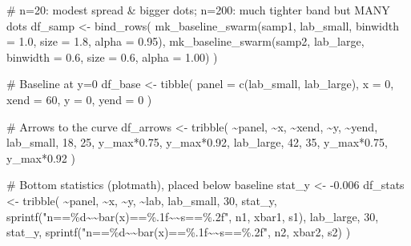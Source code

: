 \documentclass[
  letterpaper,
  DIV=11,
  numbers=noendperiod]{scrreprt}
\newenvironment{Shaded}{\begin{snugshade}}{\end{snugshade}}
\newcommand{\AttributeTok}[1]{\textcolor[rgb]{0.40,0.45,0.13}{#1}}
\newcommand{\CommentTok}[1]{\textcolor[rgb]{0.37,0.37,0.37}{#1}}
\newcommand{\DecValTok}[1]{\textcolor[rgb]{0.68,0.00,0.00}{#1}}
\newcommand{\FloatTok}[1]{\textcolor[rgb]{0.68,0.00,0.00}{#1}}
\newcommand{\FunctionTok}[1]{\textcolor[rgb]{0.28,0.35,0.67}{#1}}
\newcommand{\NormalTok}[1]{\textcolor[rgb]{0.00,0.23,0.31}{#1}}
\newcommand{\OtherTok}[1]{\textcolor[rgb]{0.00,0.23,0.31}{#1}}
\newcommand{\SpecialCharTok}[1]{\textcolor[rgb]{0.37,0.37,0.37}{#1}}
\newcommand{\StringTok}[1]{\textcolor[rgb]{0.13,0.47,0.30}{#1}}
\begin{document}
\begin{Shaded}
\begin{Highlighting}[]
\CommentTok{\# n=20: modest spread \& bigger dots; n=200: much tighter band but MANY dots}
\NormalTok{df\_samp }\OtherTok{\textless{}{-}} \FunctionTok{bind\_rows}\NormalTok{(}
  \FunctionTok{mk\_baseline\_swarm}\NormalTok{(samp1, lab\_small, }\AttributeTok{binwidth =} \FloatTok{1.0}\NormalTok{, }\AttributeTok{size =} \FloatTok{1.8}\NormalTok{, }\AttributeTok{alpha =} \FloatTok{0.95}\NormalTok{),}
  \FunctionTok{mk\_baseline\_swarm}\NormalTok{(samp2, lab\_large, }\AttributeTok{binwidth =} \FloatTok{0.6}\NormalTok{, }\AttributeTok{size =} \FloatTok{0.6}\NormalTok{, }\AttributeTok{alpha =} \FloatTok{1.00}\NormalTok{)}
\NormalTok{)}

\CommentTok{\# Baseline at y=0}
\NormalTok{df\_base }\OtherTok{\textless{}{-}} \FunctionTok{tibble}\NormalTok{(}
  \AttributeTok{panel =} \FunctionTok{c}\NormalTok{(lab\_small, lab\_large),}
  \AttributeTok{x =} \DecValTok{0}\NormalTok{, }\AttributeTok{xend =} \DecValTok{60}\NormalTok{, }\AttributeTok{y =} \DecValTok{0}\NormalTok{, }\AttributeTok{yend =} \DecValTok{0}
\NormalTok{)}

\CommentTok{\# Arrows to the curve}
\NormalTok{df\_arrows }\OtherTok{\textless{}{-}} \FunctionTok{tribble}\NormalTok{(}
  \SpecialCharTok{\textasciitilde{}}\NormalTok{panel,      }\SpecialCharTok{\textasciitilde{}}\NormalTok{x,  }\SpecialCharTok{\textasciitilde{}}\NormalTok{xend, }\SpecialCharTok{\textasciitilde{}}\NormalTok{y,                  }\SpecialCharTok{\textasciitilde{}}\NormalTok{yend,}
\NormalTok{  lab\_small,   }\DecValTok{18}\NormalTok{,    }\DecValTok{25}\NormalTok{,   y\_max}\SpecialCharTok{*}\FloatTok{0.75}\NormalTok{,         y\_max}\SpecialCharTok{*}\FloatTok{0.92}\NormalTok{,}
\NormalTok{  lab\_large,   }\DecValTok{42}\NormalTok{,    }\DecValTok{35}\NormalTok{,   y\_max}\SpecialCharTok{*}\FloatTok{0.75}\NormalTok{,         y\_max}\SpecialCharTok{*}\FloatTok{0.92}
\NormalTok{)}

\CommentTok{\# Bottom statistics (plotmath), placed below baseline}
\NormalTok{stat\_y }\OtherTok{\textless{}{-}} \SpecialCharTok{{-}}\FloatTok{0.006}
\NormalTok{df\_stats }\OtherTok{\textless{}{-}} \FunctionTok{tribble}\NormalTok{(}
  \SpecialCharTok{\textasciitilde{}}\NormalTok{panel,      }\SpecialCharTok{\textasciitilde{}}\NormalTok{x, }\SpecialCharTok{\textasciitilde{}}\NormalTok{y,       }\SpecialCharTok{\textasciitilde{}}\NormalTok{lab,}
\NormalTok{  lab\_small,   }\DecValTok{30}\NormalTok{, stat\_y, }\FunctionTok{sprintf}\NormalTok{(}\StringTok{"n==\%d\textasciitilde{}\textasciitilde{}bar(x)==\%.1f\textasciitilde{}\textasciitilde{}s==\%.2f"}\NormalTok{, n1, xbar1, s1),}
\NormalTok{  lab\_large,   }\DecValTok{30}\NormalTok{, stat\_y, }\FunctionTok{sprintf}\NormalTok{(}\StringTok{"n==\%d\textasciitilde{}\textasciitilde{}bar(x)==\%.1f\textasciitilde{}\textasciitilde{}s==\%.2f"}\NormalTok{, n2, xbar2, s2)}
\NormalTok{)}


\end{Highlighting}
\end{Shaded}
\end{document}
